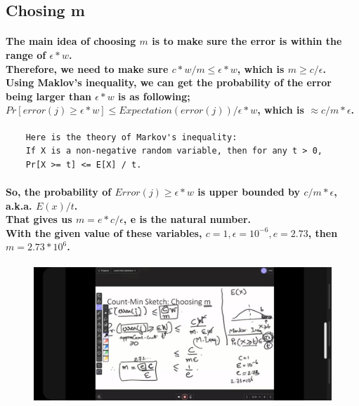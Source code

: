 \documentclass{article}
\begin{document}
\subsection{Chosing m}

\paragraph{
    The main idea of choosing $m$ is to make sure the error is within the range of $\epsilon*w$.\\
    Therefore, we need to make sure $c*w/m \leq \epsilon*w$, which is $m \geq c/\epsilon$.\\
    Using Maklov's inequality, we can get the probability of the error being larger than $\epsilon*w$ is as following;\\
    $Pr[error(j) \geq \epsilon*w] \leq Expectation(error(j)) / \epsilon*w$, which is $\approx c/m*\epsilon$.\\
}

\begin{verbatim}
    Here is the theory of Markov's inequality:
    If X is a non-negative random variable, then for any t > 0,
    Pr[X >= t] <= E[X] / t.
\end{verbatim}

\paragraph{
    So, the probability of $Error(j) \geq \epsilon*w$ is upper bounded by $c/m*\epsilon$, a.k.a. $E(x)/t$.\\
    That gives us $m = e*c/\epsilon$, e is the natural number.\\
    With the given value of these variables, $c=1,\epsilon=10^{-6}, e=2.73$, then $m=2.73*10^6$.\\
}

\begin{figure}[H]
    \includegraphics[width=\textwidth]{choosingm.jpg}
\end{figure}
\end{document}

